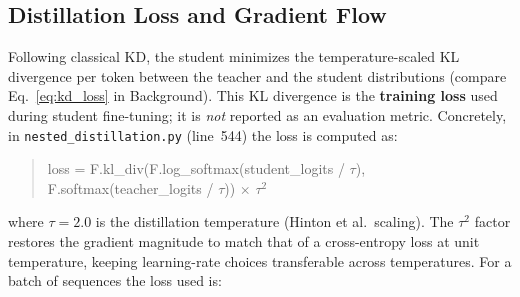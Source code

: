 \documentclass[11pt, a4paper]{article}
\begin{document}
\subsection{Distillation Loss and Gradient Flow}

Following classical KD, the student minimizes the temperature-scaled KL divergence
per token between the teacher and the student distributions (compare
Eq.~\eqref{eq:kd_loss} in Background). This KL divergence is the \textbf{training loss}
used during student fine-tuning; it is \emph{not} reported as an evaluation metric.
Concretely, in \texttt{nested\_distillation.py} (line~544) the loss is computed as:
\begin{quote}\ttfamily\small
loss = F.kl\_div(F.log\_softmax(student\_logits / $\tau$), \\
\hspace*{2em}F.softmax(teacher\_logits / $\tau$)) $\times$ $\tau^2$
\end{quote}
where $\tau = 2.0$ is the distillation temperature (Hinton et al.\ scaling). The $\tau^2$
factor restores the gradient magnitude to match that of a cross-entropy loss at unit
temperature, keeping learning-rate choices transferable across temperatures.
For a batch of sequences the loss used is:
\end{document}
